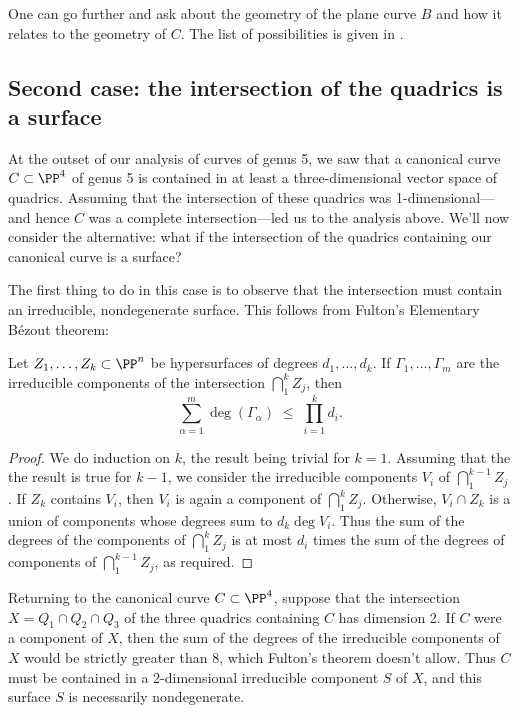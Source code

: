 One can go further and ask about the geometry of the plane curve $B$ and how it relates to the geometry of $C$. The list of possibilities is given in \cite[p. 274]{ACGH}. %

\subsection{Second case: the intersection of the quadrics is a surface}\label{trigonal genus 5}

At the outset of our analysis of curves of genus 5, we saw that a canonical curve $C \subset \PP^4$ of genus 5 is contained in at least a three-dimensional vector space of quadrics. Assuming that the intersection of these quadrics was 1-dimensional---and hence $C$ was a complete intersection---led us to the analysis above. We'll now consider the alternative: what if the intersection of the quadrics containing our canonical curve is a surface?

The first thing to do in this case is to observe that the intersection must contain an irreducible, nondegenerate surface. This  follows from Fulton's Elementary B\'ezout  theorem:

\begin{theorem}\cite{Fulton}\label{Fulton Bezout}
Let $Z_1,\dots, Z_k \subset \PP^n$ be hypersurfaces of degrees $d_1,\dots,d_k$. If $\Gamma_1,\dots,\Gamma_m$ are the irreducible components of the intersection $\bigcap_1^kZ_j$, then
$$
\sum_{\alpha = 1}^m \deg(\Gamma_\alpha) \; \leq \; \prod_{i=1}^k d_i.
$$
\end{theorem}

\begin{proof}
We do induction on $k$, the result being trivial for $k=1$. Assuming that the the result
is true for $k-1$, we consider the irreducible components $V_i$ of $\bigcap_1^{k-1}Z_j$. If $Z_k$ contains
$V_i$, then $V_i$ is again a component of $\bigcap_1^kZ_j$. Otherwise,
$V_i\cap Z_k$ is a union of components whose degrees sum to $d_k\deg V_i$. Thus
the sum of the degrees of the components of $\bigcap_1^kZ_j$ is at most $d_i$ times the
sum of the degrees of components of $\bigcap_1^{k-1}Z_j$, as required.
\end{proof}

Returning to the canonical curve $C \subset \PP^4$, suppose that the intersection $X = Q_1 \cap Q_2 \cap Q_3$ of the three quadrics containing $C$ has dimension 2. If $C$ were a component of $X$, then the sum of the degrees of the irreducible components of $X$ would be strictly greater than 8, which Fulton's theorem doesn't allow. Thus $C$ must be contained in a 2-dimensional irreducible component  $S$ of $X$, and this surface $S$ is necessarily nondegenerate.

